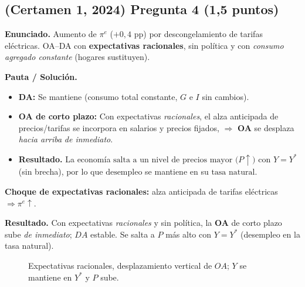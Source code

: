 \documentclass[11pt,addpoints]{article}
\begin{document}
\subsection*{(Certamen 1, 2024) \quad Pregunta 4 (1,5 puntos)}
\textbf{Enunciado.} Aumento de \(\pi^e\) (\(+0{,}4\) pp) por descongelamiento de tarifas eléctricas. OA--DA con \textbf{expectativas racionales}, sin política y con \emph{consumo agregado constante} (hogares sustituyen).

\textbf{Pauta / Solución.}
\begin{itemize}
\item \textbf{DA:} Se mantiene (consumo total constante, \(G\) e \(I\) sin cambios).
\item \textbf{OA de corto plazo:} Con expectativas \emph{racionales}, el alza anticipada de precios/tarifas se incorpora en salarios y precios fijados, \(\Rightarrow\) \textbf{OA} se desplaza \emph{hacia arriba} \emph{de inmediato}.
\item \textbf{Resultado.} La economía \(\boxed{\text{salta a un nivel de precios mayor}}\) \(\big(P\!\uparrow\big)\) con \(\boxed{Y=Y^*}\) (sin brecha), por lo que \(\boxed{\text{desempleo}}\) se mantiene en su \(\boxed{\text{tasa natural}}\).
\end{itemize}

\textbf{Choque de expectativas racionales: } alza anticipada de tarifas eléctricas \(\Rightarrow \pi^e\uparrow\).

\textbf{Resultado.} Con expectativas \emph{racionales} y sin política, la \textbf{OA} de corto plazo sube \emph{de inmediato}; \(DA\) estable. Se salta a \(P\) más alto con \(Y=Y^*\) (desempleo en la tasa natural).

\begin{figure}[h!]
\centering
{}
\caption{Expectativas racionales, desplazamiento vertical de $OA$; $Y$ se mantiene en $Y^*$ y $P$ sube.}
\end{figure}
\end{document}

